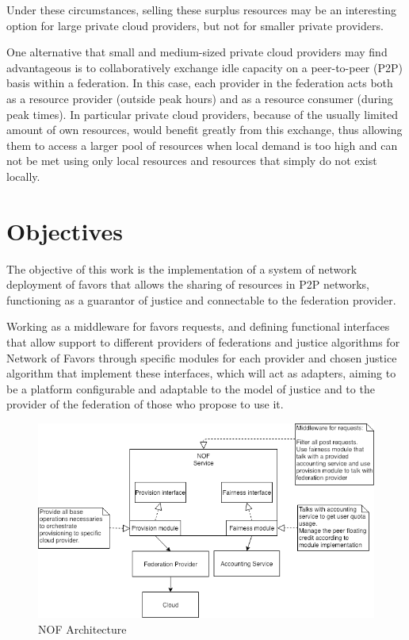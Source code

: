 \documentclass{article}
\begin{document}
Under these circumstances, selling these surplus resources may be an interesting option for large private cloud providers, but not for smaller private providers.

One alternative that small and medium-sized private cloud providers may find advantageous is to collaboratively exchange idle capacity on a peer-to-peer (P2P) basis within a federation. In this case, each provider in the federation acts both as a resource provider (outside peak hours) and as a resource consumer (during peak times). In particular private cloud providers, because of the usually limited amount of own resources, would benefit greatly from this exchange\cite{fairness-benefices}, thus allowing them to access a larger pool of resources when local demand is too high and can not be met using only local resources and resources that simply do not exist locally.

\section{Objectives}
The objective of this work is the implementation of a system of network deployment of favors that allows the sharing of resources in P2P networks, functioning as a guarantor of justice and connectable to the federation provider.

Working as a middleware for favors requests, and defining functional interfaces that allow support to different providers of federations and justice algorithms for Network of Favors through specific modules for each provider and chosen justice algorithm that implement these interfaces, which will act as adapters, aiming to be a platform configurable and adaptable to the model of justice and to the provider of the federation of those who propose to use it.

\begin{figure}[h!]
    \centering
    \includegraphics[scale=0.4]{./image/NOF-architecture-generic.png}
    \caption{NOF Architecture}
\end{figure}
\end{document}
